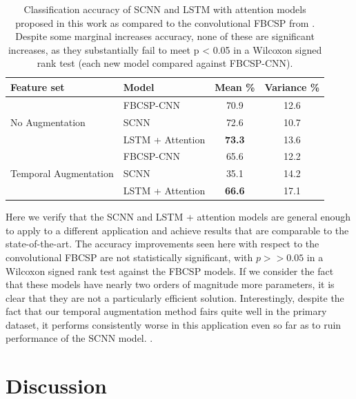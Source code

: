 \documentclass[utf8]{frontiersSCNS} %
\begin{document}
\begin{table}[t]
  \centering
  \label{tab:end2end_results}
  \begin{tabular}{l l | c | c}
    \toprule
    \textbf{Feature set} & \textbf{Model} & \textbf{Mean \%} & \textbf{Variance \%} \\
    \toprule
    \multirow{3}{*}{No Augmentation}
                         & FBCSP-CNN           & 70.9 & 12.6  \\
                         & SCNN                & 72.6 & 10.7  \\
                         & LSTM + Attention    & \textbf{73.3} & 13.6  \\ 
    \midrule
    \multirow{3}{*}{Temporal Augmentation}
                         & FBCSP-CNN           & 65.6 & 12.2  \\
                         & SCNN                & 35.1 & 14.2  \\
                         & LSTM + Attention    & \textbf{66.6} & 17.1  \\ 
    \bottomrule
  \end{tabular}
  \caption{Classification accuracy of SCNN and LSTM with attention models proposed in this work as compared to the convolutional FBCSP from \cite{Schirrmeister2017}. Despite some marginal increases accuracy, none of these are significant increases, as they substantially fail to meet p < 0.05 in a Wilcoxon signed rank test (each new model compared against FBCSP-CNN).}
\end{table}

Here we verify that the SCNN and LSTM + attention models are general enough to apply to a different application and achieve results that are comparable to the state-of-the-art. The accuracy improvements seen here with respect to the convolutional FBCSP are not statistically significant, with $p >> 0.05$ in a Wilcoxon signed rank test against the FBCSP models. If we consider the fact that these models have nearly two orders of magnitude more parameters, it is clear that they are not a particularly efficient solution. Interestingly, despite the fact that our temporal augmentation method fairs quite well in the primary dataset, it performs consistently worse in this application even so far as to ruin performance of the SCNN model. .

\section{Discussion}
\end{document}

